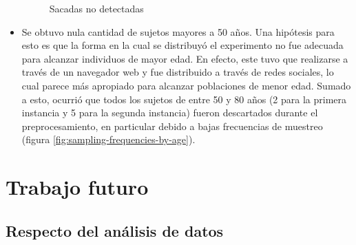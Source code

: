 \begin{itemize}
\begin{figure}
        \caption{Sacadas no detectadas}
        \label{fig:undetected-saccades-examples}
      \end{figure}

    \item
      Se obtuvo nula cantidad de sujetos mayores a 50 años.
      Una hipótesis para esto es que la forma en la cual se distribuyó el
      experimento no fue adecuada para alcanzar individuos de mayor edad.
      En efecto, este tuvo que realizarse a través de un navegador web y fue
      distribuido a través de redes sociales, lo cual parece más apropiado para
      alcanzar poblaciones de menor edad.
      Sumado a esto, ocurrió que todos los sujetos de entre 50 y 80 años (2
      para la primera instancia y 5 para la segunda instancia) fueron
      descartados durante el preprocesamiento, en particular debido a bajas
      frecuencias de muestreo (figura \ref{fig:sampling-frequencies-by-age}).

  \end{itemize}

\section{Trabajo futuro}

\subsection{Respecto del análisis de datos}


